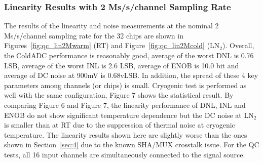 \subsubsection{Linearity Results with 2 Ms/s/channel Sampling Rate}
The results of the linearity and noise measurements at the nominal 2 Ms/s/channel sampling rate for the 32 chips are shown in 
Figures~\ref{fig:qc_lin2Mwarm} (RT) and Figure~\ref{fig:qc_lin2Mcold} (LN$_2$). 
Overall, the ColdADC performance is reasonably good, average of the worst DNL is 0.76 LSB, average of the worst INL is 2.6 LSB, 
average of ENOB is 10.0 bit and average of DC noise at 900mV is 0.68vLSB. In addition, the spread of these 4 key parameters 
among channels (or chips) is small.
Cryogenic test is performed as well with the same configuration,  Figure 7 shows the statistical result. 
By comparing Figure 6 and Figure 7, the linearity  performance of DNL, INL and ENOB do not show significant temperature dependence
 but the DC noise at LN$_2$ is smaller than at RT due to the suppression of thermal noise at cryogenic temperature.  
The linearity results shown here are slightly worse than the ones shown in Section~\ref{sec:4} due to the known SHA/MUX crosstalk issue.
For the QC tests, all 16 input channels are simultaneously connected to the signal source.

